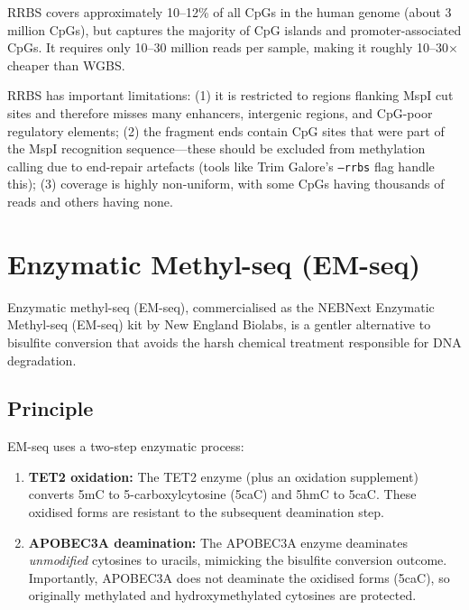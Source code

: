 RRBS covers approximately 10--12\% of all CpGs in the human genome (about 3 million CpGs), but captures the majority of CpG islands and promoter-associated CpGs. It requires only 10--30 million reads per sample, making it roughly 10--30$\times$ cheaper than WGBS.

\begin{warningbox}
RRBS has important limitations: (1) it is restricted to regions flanking MspI cut sites and therefore misses many enhancers, intergenic regions, and CpG-poor regulatory elements; (2) the fragment ends contain CpG sites that were part of the MspI recognition sequence---these should be excluded from methylation calling due to end-repair artefacts (tools like Trim Galore's \texttt{--rrbs} flag handle this); (3) coverage is highly non-uniform, with some CpGs having thousands of reads and others having none.
\end{warningbox}

\section{Enzymatic Methyl-seq (EM-seq)}
\label{sec:methylation:emseq}

Enzymatic methyl-seq (EM-seq), commercialised as the NEBNext Enzymatic Methyl-seq (EM-seq) kit by New England Biolabs, is a gentler alternative to bisulfite conversion that avoids the harsh chemical treatment responsible for DNA degradation.

\subsection{Principle}
\label{subsec:methylation:emseq-principle}

EM-seq uses a two-step enzymatic process:

\begin{enumerate}[itemsep=3pt]
  \item \textbf{TET2 oxidation:} The TET2 enzyme (plus an oxidation supplement) converts 5mC to 5-carboxylcytosine (5caC) and 5hmC to 5caC. These oxidised forms are resistant to the subsequent deamination step.
  \item \textbf{APOBEC3A deamination:} The APOBEC3A enzyme deaminates \textit{unmodified} cytosines to uracils, mimicking the bisulfite conversion outcome. Importantly, APOBEC3A does not deaminate the oxidised forms (5caC), so originally methylated and hydroxymethylated cytosines are protected.
\end{enumerate}


